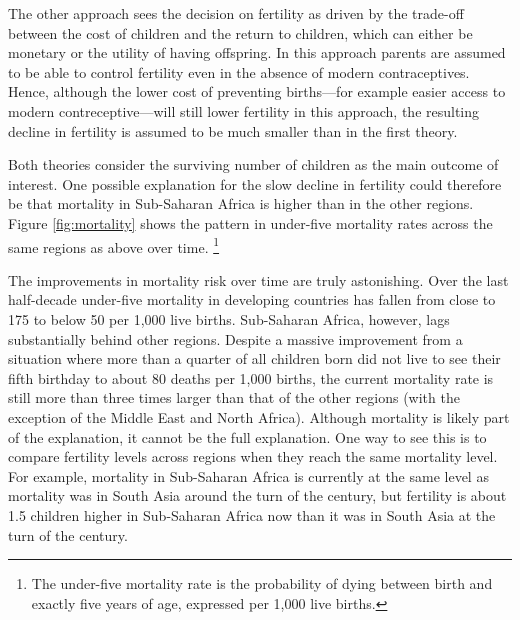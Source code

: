 \documentclass[letterpaper,12pt]{article}
\begin{document}
The other approach sees the decision on fertility as driven by the
trade-off between the cost of children and the return to children, which
can either be monetary or the utility of having offspring.
In this approach parents are assumed to be able to control fertility
even in the absence of modern contraceptives.
Hence, although the lower cost of preventing births---for example easier
access to modern contreceptive---will still lower fertility in this
approach, the resulting decline in fertility is assumed to be much
smaller than in the first theory.


Both theories consider the surviving number of children as the main
outcome of interest.
One possible explanation for the slow decline in fertility could
therefore be that mortality in Sub-Saharan Africa is higher than in the
other regions.
Figure \ref{fig:mortality} shows the pattern in under-five mortality rates 
across the same regions as above over time.%
\footnote{
The under-five mortality rate is the probability of dying between birth and 
exactly five years of age, expressed per 1,000 live births.
}

The improvements in mortality risk over time are truly astonishing.
Over the last half-decade under-five mortality in developing countries has
fallen from close to 175 to below 50 per 1,000 live births.
Sub-Saharan Africa, however, lags substantially behind other regions.
Despite a massive improvement from a situation where more than a quarter
of all children born did not live to see their fifth birthday to about
80 deaths per 1,000 births, the current mortality rate is still more
than three times larger than that of the other regions (with the
exception of the Middle East and North Africa).
Although mortality is likely part of the explanation, it cannot be the
full explanation.
One way to see this is to compare fertility levels across regions when
they reach the same mortality level.
For example, mortality in Sub-Saharan Africa is currently at the same level 
as mortality was in South Asia around the turn of the century, but fertility 
is about 1.5 children higher in Sub-Saharan Africa now than it was in South 
Asia at the turn of the century.
\end{document}
